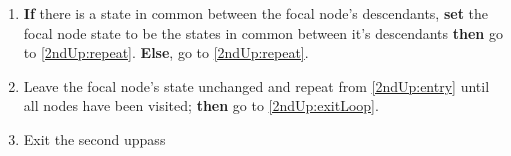 \documentclass[a4paper,12pt]{article}
\begin{document}
\begin{enumerate}
    \item \label{2ndUp:AncInapp} \textbf{If} there is a state in common between the focal node's descendants, \textbf{set} the focal node state to be the states in common between it's descendants \textbf{then} go to \ref{2ndUp:repeat}. \textbf{Else}, go to \ref{2ndUp:repeat}.
    \item \label{2ndUp:repeat} Leave the focal node's state unchanged and repeat from \ref{2ndUp:entry} until all nodes have been visited; \textbf{then} go to \ref{2ndUp:exitLoop}.
    \item \label{2ndUp:exitLoop} Exit the second uppass
\end{enumerate}
\end{document}

